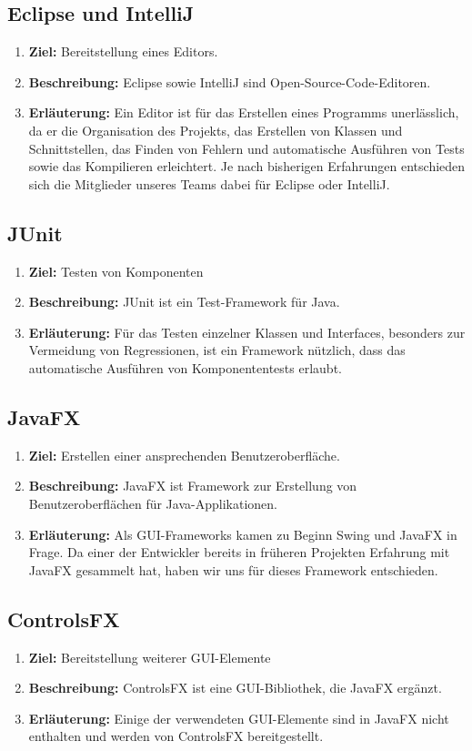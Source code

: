 \documentclass[parskip=full,11pt]{scrartcl}
\begin{document}
\subsection{Eclipse und IntelliJ}
\begin{enumerate}
\item[] \textbf{Ziel:} Bereitstellung eines Editors.
\item[] \textbf{Beschreibung:} Eclipse sowie IntelliJ sind Open-Source-Code-Editoren.
\item[] \textbf{Erläuterung:} Ein Editor ist für das Erstellen eines Programms unerlässlich, da er die Organisation des Projekts, das Erstellen von Klassen und Schnittstellen, das Finden von Fehlern und automatische Ausführen von Tests sowie das Kompilieren erleichtert. Je nach bisherigen Erfahrungen entschieden sich die Mitglieder unseres Teams dabei für Eclipse oder IntelliJ.
\end{enumerate}
\subsection{JUnit}
\begin{enumerate}
\item[] \textbf{Ziel:} Testen von Komponenten
\item[] \textbf{Beschreibung:} JUnit ist ein Test-Framework für Java.
\item[] \textbf{Erläuterung:} Für das Testen einzelner Klassen und Interfaces, besonders zur Vermeidung von Regressionen, ist ein Framework nützlich, dass das automatische Ausführen von Komponententests erlaubt.
\end{enumerate}
\subsection{JavaFX}
\begin{enumerate}
\item[] \textbf{Ziel:} Erstellen einer ansprechenden Benutzeroberfläche.
\item[] \textbf{Beschreibung:} JavaFX ist Framework zur Erstellung von Benutzeroberflächen für Java-Applikationen.
\item[] \textbf{Erläuterung:} Als GUI-Frameworks kamen zu Beginn Swing und JavaFX in Frage. Da einer der Entwickler bereits in früheren Projekten Erfahrung mit JavaFX gesammelt hat, haben wir uns für dieses Framework entschieden.
\end{enumerate}
\subsection{ControlsFX}
\begin{enumerate}
\item[] \textbf{Ziel:} Bereitstellung weiterer GUI-Elemente
\item[] \textbf{Beschreibung:} ControlsFX ist eine GUI-Bibliothek, die JavaFX ergänzt.
\item[] \textbf{Erläuterung:} Einige der verwendeten GUI-Elemente sind in JavaFX nicht enthalten und werden von ControlsFX bereitgestellt.
\end{enumerate}
\end{document}
